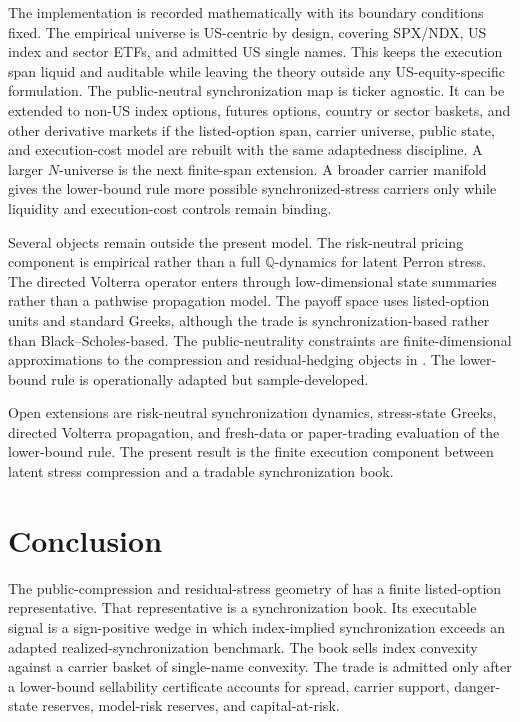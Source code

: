 \documentclass[11pt,a4paper]{amsart}
\theoremstyle{plain}
\theoremstyle{definition}
\theoremstyle{remark}
\newcommand{\QQ}{\mathbb{Q}}
\begin{document}
The implementation is recorded mathematically with its boundary conditions fixed.  The empirical
universe is US-centric by design, covering SPX/NDX, US index and sector ETFs, and admitted US
single names.  This keeps the execution span liquid and auditable while leaving the theory outside any
US-equity-specific formulation.  The public-neutral synchronization map is ticker agnostic.  It can be
extended to non-US index options, futures options, country or sector baskets, and other derivative
markets if the listed-option span, carrier universe, public state, and execution-cost model are
rebuilt with the same adaptedness discipline.  A larger \(N\)-universe is the next finite-span
extension.  A broader carrier manifold gives the lower-bound rule more possible synchronized-stress
carriers only while liquidity and execution-cost controls remain binding.

Several objects remain outside the present model.  The risk-neutral pricing component is empirical
rather than a full \(\QQ\)-dynamics for latent Perron stress.  The directed Volterra operator enters
through low-dimensional state summaries rather than a pathwise propagation model.  The payoff space
uses listed-option units and standard Greeks, although the trade is synchronization-based rather
than Black--Scholes-based.  The public-neutrality constraints are finite-dimensional
approximations to the compression and residual-hedging objects in
\cite{vidal2026compression,vidal2026pricing}.  The lower-bound rule is operationally adapted but
sample-developed.

Open extensions are risk-neutral synchronization dynamics, stress-state Greeks, directed Volterra
propagation, and fresh-data or paper-trading evaluation of the lower-bound rule.  The present
result is the finite execution component between latent stress compression and a tradable
synchronization book.

\section{Conclusion}\label{sec:conclusion}

The public-compression and residual-stress geometry of
\cite{vidal2026compression,vidal2026pricing} has a finite listed-option representative.  That
representative is a synchronization book.  Its executable signal is a sign-positive wedge in which
index-implied synchronization exceeds an adapted realized-synchronization benchmark.  The book
sells index convexity against a carrier basket of single-name convexity.  The trade is admitted only
after a lower-bound sellability certificate accounts for spread, carrier support, danger-state
reserves, model-risk reserves, and capital-at-risk.
\end{document}
